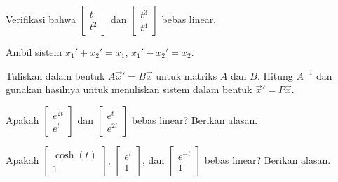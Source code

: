 \begin{exercise}
Verifikasi bahwa
$\left[ \begin{smallmatrix}
t \\ t^2
\end{smallmatrix} \right]$ dan
$\left[ \begin{smallmatrix}
t^3 \\ t^4
\end{smallmatrix} \right]$
bebas linear.
\end{exercise}

\begin{exercise}
Ambil sistem $x_1' + x_2' = x_1$,
$x_1' - x_2' = x_2$.
\begin{tasks}
\task Tuliskan dalam bentuk
$A {\vec{x}}' = B \vec{x}$ untuk matriks $A$ dan $B$.
\task Hitung $A^{-1}$ dan gunakan hasilnya untuk menuliskan sistem dalam bentuk
${\vec{x}}' = P \vec{x}$.
\end{tasks}
\end{exercise}

\setcounter{exercise}{100}

\begin{exercise}
Apakah
$\left[ \begin{smallmatrix}
e^{2t} \\ e^t
\end{smallmatrix}\right]$
dan
$\left[ \begin{smallmatrix}
e^{t} \\ e^{2t}
\end{smallmatrix}\right]$
bebas linear?  Berikan alasan.
\end{exercise}

\begin{exercise}
Apakah
$\left[ \begin{smallmatrix}
\cosh(t) \\ 1
\end{smallmatrix}\right]$,
$\left[ \begin{smallmatrix}
e^{t} \\ 1
\end{smallmatrix}\right]$,
dan
$\left[ \begin{smallmatrix}
e^{-t} \\ 1
\end{smallmatrix}\right]$
bebas linear?  Berikan alasan.
\end{exercise}

